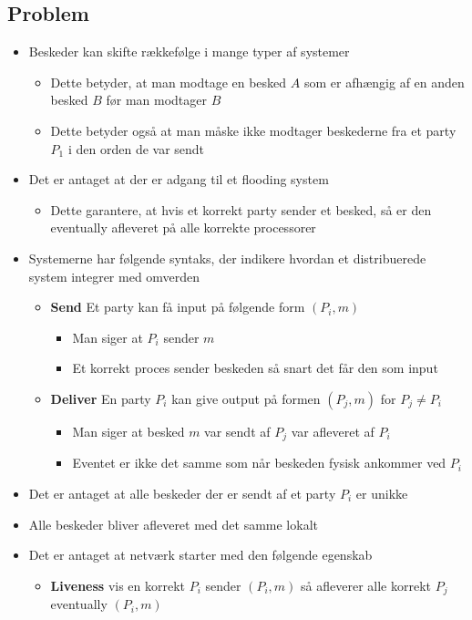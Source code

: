 \documentclass[a4, english]{article}
\begin{document}
\subsection{Problem}
\begin{itemize}
	\item Beskeder kan skifte rækkefølge i mange typer af systemer  
  \begin{itemize}
  	\item Dette betyder, at man modtage en besked $A$ som er afhængig af en anden besked $B$ før man modtager $B$ 
    \item Dette betyder også at man måske ikke modtager beskederne fra et party $P_1$ i den orden de var sendt
  \end{itemize}
  \item Det er antaget at der er adgang til et flooding system  
  \begin{itemize}
    \item Dette garantere, at hvis et korrekt party sender et besked, så er den eventually afleveret på alle korrekte processorer 
  \end{itemize}
  \item Systemerne har følgende syntaks, der indikere hvordan et distribuerede system integrer med omverden  
  \begin{itemize}
  	\item \textbf{Send} Et party kan få input på følgende form $(P_i,m)$ 
    \begin{itemize}
    	\item Man siger at $P_i$ sender $m$ 
      \item Et korrekt proces sender beskeden så snart det får den som input 
    \end{itemize}
    \item \textbf{Deliver} En party $P_i$ kan give output på formen $(P_j,m)$ for $P_j \ne P_i$ 
    \begin{itemize}
    	\item Man siger at besked $m$ var sendt af $P_j$ var afleveret af $P_i$ 
      \item Eventet er ikke det samme som når beskeden fysisk ankommer ved $P_i$ 
    \end{itemize}
  \end{itemize}
  \item Det er antaget at alle beskeder der er sendt af et party $P_i$ er unikke  
  \item Alle beskeder bliver afleveret med det samme lokalt 
  \item Det er antaget at netværk starter med den følgende egenskab
  \begin{itemize}
  	\item \textbf{Liveness} vis en korrekt $P_i$ sender $(P_i,m)$ så afleverer alle korrekt $P_j$ eventually $(P_i,m)$ 
  \end{itemize}
\end{itemize}
\end{document}
